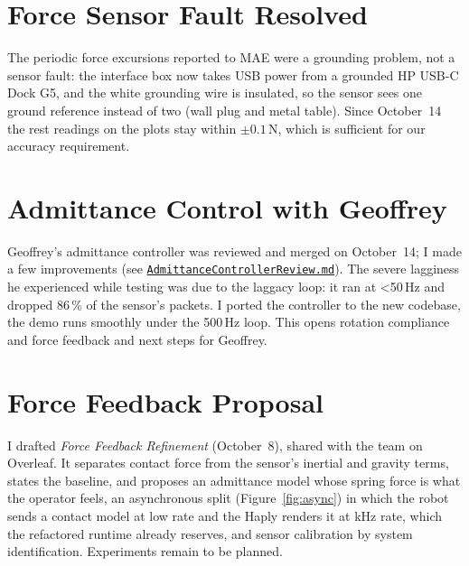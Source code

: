 \documentclass[11pt]{article}
\begin{document}
\section{Force Sensor Fault Resolved}

The periodic force excursions reported to MAE were a grounding problem, not a sensor fault: the interface box now
takes USB power from a grounded HP USB-C Dock G5, and the white grounding wire is insulated, so the sensor sees one
ground reference instead of two (wall plug and metal table).
Since October~14 the rest readings on the plots stay within $\pm 0.1$\,N, which is sufficient for our accuracy
requirement.

\section{Admittance Control with Geoffrey}

Geoffrey's admittance controller was reviewed and merged on October~14; I made a few improvements (see 
\href{https://gitlabc.nrc-cnrc.gc.ca/Yiran.Liu/nrc_robot_manipulation/-/blob/teleop-refactor/Documentation/Journal/2026Oct/AdmittanceControllerReview.md}{\texttt{AdmittanceControllerReview.md}}).
The severe lagginess he experienced while testing was due to the laggacy loop: it ran at <50\,Hz and dropped 86\,\% of the sensor's packets.
I ported the controller to the new codebase, the demo runs smoothly under the 500\,Hz loop. This opens rotation compliance and force feedback and next steps for Geoffrey.

\section{Force Feedback Proposal}
\label{sec:ff}

I drafted \emph{Force Feedback Refinement} (October~8), shared with the team on Overleaf.
It separates contact force from the sensor's inertial and gravity terms, states the baseline, and proposes an
admittance model whose spring force is what the operator feels, an asynchronous split (Figure~\ref{fig:async}) in
which the robot sends a contact model at low rate and the Haply renders it at kHz rate, which the refactored
runtime already reserves, and sensor calibration by system identification. Experiments remain to be planned.
\end{document}

